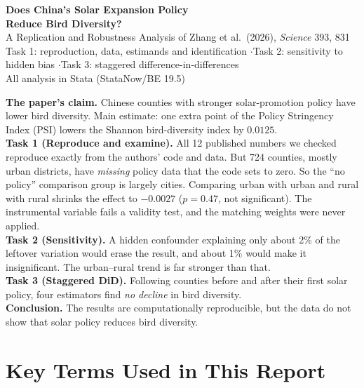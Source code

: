 \documentclass[11pt]{article}
\begin{document}
\begin{center}
{\LARGE\bfseries Does China's Solar Expansion Policy\\[2pt] Reduce Bird Diversity?}\\[6pt]
{\large A Replication and Robustness Analysis of Zhang et al.\ (2026), \textit{Science} 393, 831}\\[6pt]
{\small Task 1: reproduction, data, estimands and identification \quad$\cdot$\quad Task 2: sensitivity to hidden bias \quad$\cdot$\quad Task 3: staggered difference-in-differences}\\[2pt]
{\small All analysis in Stata (StataNow/BE 19.5)}
\end{center}

\begin{summarybox}
\small
\textbf{The paper's claim.} Chinese counties with stronger solar-promotion policy have lower bird diversity. Main estimate: one extra point of the Policy Stringency Index (PSI) lowers the Shannon bird-diversity index by $0.0125$.\\[3pt]
\textbf{Task 1 (Reproduce and examine).} All 12 published numbers we checked reproduce exactly from the authors' code and data. But 724 counties, mostly urban districts, have \emph{missing} policy data that the code sets to zero. So the ``no policy'' comparison group is largely cities. Comparing urban with urban and rural with rural shrinks the effect to $-0.0027$ ($p=0.47$, not significant). The instrumental variable fails a validity test, and the matching weights were never applied.\\[3pt]
\textbf{Task 2 (Sensitivity).} A hidden confounder explaining only about 2\% of the leftover variation would erase the result, and about 1\% would make it insignificant. The urban--rural trend is far stronger than that.\\[3pt]
\textbf{Task 3 (Staggered DiD).} Following counties before and after their first solar policy, four estimators find \emph{no decline} in bird diversity.\\[3pt]
\textbf{Conclusion.} The results are computationally reproducible, but the data do not show that solar policy reduces bird diversity.
\end{summarybox}

\tableofcontents
\newpage

\section*{Key Terms Used in This Report}
\end{document}
